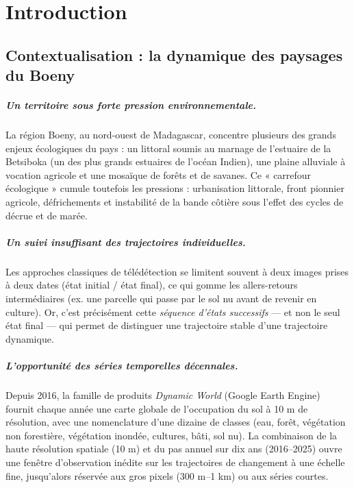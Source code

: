 
\chapter{Introduction}
\label{ch:introduction}

\section{Contextualisation : la dynamique des paysages du Boeny}

\paragraph{Un territoire sous forte pression environnementale.} La région Boeny,
au nord-ouest de Madagascar, concentre plusieurs des grands enjeux écologiques du
pays : un littoral soumis au marnage de l'estuaire de la Betsiboka (un des plus
grands estuaires de l'océan Indien), une plaine alluviale à vocation agricole et
une mosaïque de forêts et de savanes. Ce « carrefour écologique » cumule toutefois
les pressions : urbanisation littorale, front pionnier agricole, défrichements et
instabilité de la bande côtière sous l'effet des cycles de décrue et de marée.

\paragraph{Un suivi insuffisant des trajectoires individuelles.} Les approches
classiques de télédétection se limitent souvent à deux images prises à deux dates
(état initial / état final), ce qui gomme les allers-retours intermédiaires
(ex. une parcelle qui passe par le sol nu avant de revenir en culture). Or, c'est
précisément cette \emph{séquence d'états successifs} — et non le seul état final
— qui permet de distinguer une trajectoire stable d'une trajectoire dynamique.

\paragraph{L'opportunité des séries temporelles décennales.} Depuis 2016, la
famille de produits \emph{Dynamic World} (Google Earth Engine) fournit chaque
année une carte globale de l'occupation du sol à 10 m de résolution, avec une
nomenclature d'une dizaine de classes (eau, forêt, végétation non forestière,
végétation inondée, cultures, bâti, sol nu). La combinaison de la haute
résolution spatiale (10 m) et du pas annuel sur dix ans (2016--2025) ouvre une
fenêtre d'observation inédite sur les trajectoires de changement à une échelle
fine, jusqu'alors réservée aux gros pixels (300 m--1 km) ou aux séries courtes.


